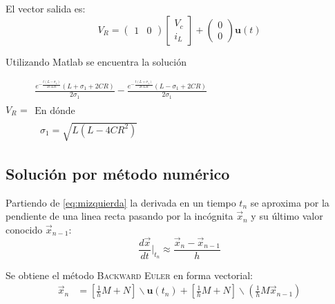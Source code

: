 \documentclass[10pt,a4paper]{article} %
\begin{document}
	El vector salida es:
	\begin{equation}
	V_R=\begin{pmatrix}
	1&0
	\end{pmatrix}\begin{bmatrix}
	V_c\\
	i_L
	\end{bmatrix}+\begin{pmatrix}
	0\\
	0
	\end{pmatrix}\textbf{u}(t)
	\end{equation}
	
	Utilizando Matlab se encuentra la solución 
	
	\begin{matlabsymbolicoutput}
		$V_R$ = 
		$\displaystyle \begin{array}{l}
		\frac{e^{-\frac{t {\left(L-\sigma_1 \right)}}{2 C L R}}  {\left(L+\sigma_1 +2 C R\right)}}{2 \sigma_1 }-\frac{e^{-\frac{t {\left(L+\sigma_1 \right)}}{2 C L R}}  {\left(L-\sigma_1 +2 C R\right)}}{2 \sigma_1 }\\
		\mathrm{}\\
		\textrm{En dónde}\\
		\mathrm{}\\
		\;\;\sigma_1 =\sqrt{L {\left(L-4 C R^2 \right)}}
		\end{array}$
	\end{matlabsymbolicoutput}
	
	\subsection{Solución por método numérico}
	Partiendo de \ref{eq:mizquierda} la derivada en un tiempo $t_n$ se aproxima por la pendiente de una linea recta pasando por la incógnita $\vec{x}_n$ y su último valor conocido $\vec{x}_{n-1}$:
	\begin{equation}
		\frac{d\vec{x}}{dt}\Bigr\rvert_{t_n}\approx\frac{\vec{x}_n-\vec{x}_{n-1}}{h}
	\end{equation}
	
	Se obtiene el método \textsc{Backward Euler} en forma vectorial:
	\begin{align}
		\vec{x}_n&=\left[\frac{1}{h}M+N\right]\backslash \textbf{u}(t_n)+\left[\frac{1}{h}M+N\right]\backslash \left(\frac{1}{h}M \vec{x}_{n-1}\right)\label{euler}
	\end{align}
	
	
\end{document}

